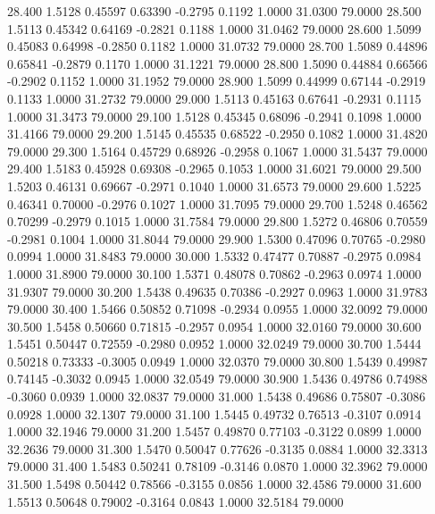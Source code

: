   28.400   1.5128   0.45597   0.63390  -0.2795   0.1192   1.0000  31.0300  79.0000
  28.500   1.5113   0.45342   0.64169  -0.2821   0.1188   1.0000  31.0462  79.0000
  28.600   1.5099   0.45083   0.64998  -0.2850   0.1182   1.0000  31.0732  79.0000
  28.700   1.5089   0.44896   0.65841  -0.2879   0.1170   1.0000  31.1221  79.0000
  28.800   1.5090   0.44884   0.66566  -0.2902   0.1152   1.0000  31.1952  79.0000
  28.900   1.5099   0.44999   0.67144  -0.2919   0.1133   1.0000  31.2732  79.0000
  29.000   1.5113   0.45163   0.67641  -0.2931   0.1115   1.0000  31.3473  79.0000
  29.100   1.5128   0.45345   0.68096  -0.2941   0.1098   1.0000  31.4166  79.0000
  29.200   1.5145   0.45535   0.68522  -0.2950   0.1082   1.0000  31.4820  79.0000
  29.300   1.5164   0.45729   0.68926  -0.2958   0.1067   1.0000  31.5437  79.0000
  29.400   1.5183   0.45928   0.69308  -0.2965   0.1053   1.0000  31.6021  79.0000
  29.500   1.5203   0.46131   0.69667  -0.2971   0.1040   1.0000  31.6573  79.0000
  29.600   1.5225   0.46341   0.70000  -0.2976   0.1027   1.0000  31.7095  79.0000
  29.700   1.5248   0.46562   0.70299  -0.2979   0.1015   1.0000  31.7584  79.0000
  29.800   1.5272   0.46806   0.70559  -0.2981   0.1004   1.0000  31.8044  79.0000
  29.900   1.5300   0.47096   0.70765  -0.2980   0.0994   1.0000  31.8483  79.0000
  30.000   1.5332   0.47477   0.70887  -0.2975   0.0984   1.0000  31.8900  79.0000
  30.100   1.5371   0.48078   0.70862  -0.2963   0.0974   1.0000  31.9307  79.0000
  30.200   1.5438   0.49635   0.70386  -0.2927   0.0963   1.0000  31.9783  79.0000
  30.400   1.5466   0.50852   0.71098  -0.2934   0.0955   1.0000  32.0092  79.0000
  30.500   1.5458   0.50660   0.71815  -0.2957   0.0954   1.0000  32.0160  79.0000
  30.600   1.5451   0.50447   0.72559  -0.2980   0.0952   1.0000  32.0249  79.0000
  30.700   1.5444   0.50218   0.73333  -0.3005   0.0949   1.0000  32.0370  79.0000
  30.800   1.5439   0.49987   0.74145  -0.3032   0.0945   1.0000  32.0549  79.0000
  30.900   1.5436   0.49786   0.74988  -0.3060   0.0939   1.0000  32.0837  79.0000
  31.000   1.5438   0.49686   0.75807  -0.3086   0.0928   1.0000  32.1307  79.0000
  31.100   1.5445   0.49732   0.76513  -0.3107   0.0914   1.0000  32.1946  79.0000
  31.200   1.5457   0.49870   0.77103  -0.3122   0.0899   1.0000  32.2636  79.0000
  31.300   1.5470   0.50047   0.77626  -0.3135   0.0884   1.0000  32.3313  79.0000
  31.400   1.5483   0.50241   0.78109  -0.3146   0.0870   1.0000  32.3962  79.0000
  31.500   1.5498   0.50442   0.78566  -0.3155   0.0856   1.0000  32.4586  79.0000
  31.600   1.5513   0.50648   0.79002  -0.3164   0.0843   1.0000  32.5184  79.0000
